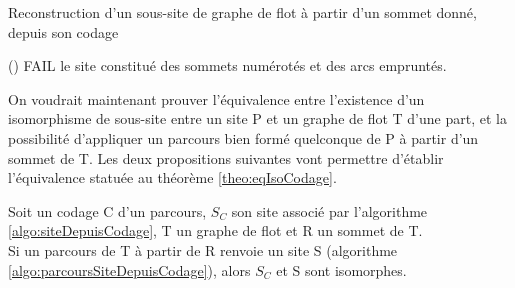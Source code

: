 \begin{algorithm}[h] %
\caption{Reconstruction d'un sous-site de graphe de flot à partir d'un sommet donné, depuis son codage}
\SetAlgoLined
{}
\Fn(){}{
{
  \Return FAIL
}
  \Return le site constitué des sommets numérotés et des arcs empruntés.
}
\label{algo:parcoursSiteDepuisCodage}
\end{algorithm}

On voudrait maintenant prouver l'équivalence entre l'existence d'un isomorphisme de sous-site entre un site P et un graphe de flot T d'une part, et la possibilité d'appliquer un parcours bien formé quelconque de P à partir d'un sommet de T. Les deux propositions suivantes vont permettre d'établir l'équivalence statuée au théorème \ref{theo:eqIsoCodage}.

\FloatBarrier
\begin{prop}
 Soit un codage C d'un parcours, $S_C$ son site associé par l'algorithme \ref{algo:siteDepuisCodage}, T un graphe de flot et R un sommet de T.\\
 Si un parcours de T à partir de R renvoie un site S (algorithme \ref{algo:parcoursSiteDepuisCodage}), alors $S_C$ et S sont isomorphes.
 \label{prop:condageDoncIso}
\end{prop}

